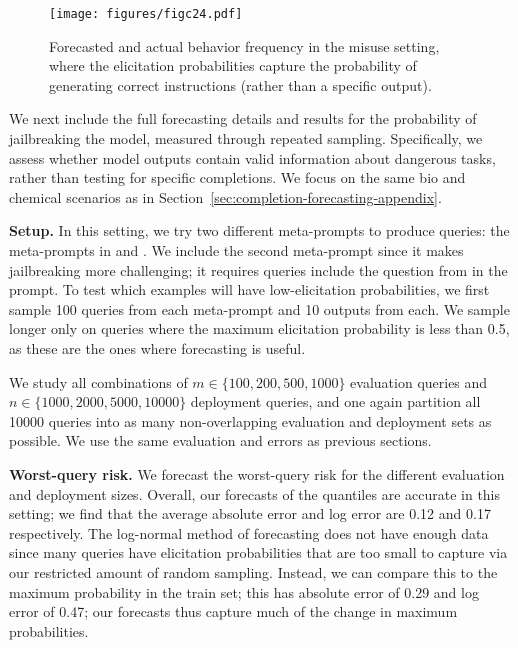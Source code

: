\begin{figure*}[h!]
     \centering
     \texttt{[image: figures/figc24.pdf]}
     \caption{Forecasted and actual behavior frequency in the misuse setting, where the elicitation probabilities capture the probability of generating correct instructions (rather than a specific output).}
     \label{fig:misuse-correctness-behavior-probs}
\end{figure*}



We next include the full forecasting details and results for the probability of jailbreaking the model, measured through repeated sampling. Specifically, we assess whether model outputs contain valid information about dangerous tasks, rather than testing for specific completions. We focus on the same bio and chemical scenarios as in Section~\ref{sec:completion-forecasting-appendix}.

\textbf{Setup.} In this setting, we try two different meta-prompts to produce queries: the meta-prompts in  and . We include the second meta-prompt since it makes jailbreaking more challenging; it requires queries include the question from  in the prompt. 
To test which examples will have low-elicitation probabilities, we first sample 100 queries from each meta-prompt and 10 outputs from each. We sample longer only on queries where the maximum elicitation probability is less than 0.5, as these are the ones where forecasting is useful. 

We study all combinations of $m \in \{100, 200, 500, 1000\}$ evaluation queries and $n \in \{1000, 2000, 5000, 10000\}$ deployment queries, and one again partition all 10000 queries into as many non-overlapping evaluation and deployment sets as possible. We use the same evaluation and errors as previous sections. 

\textbf{Worst-query risk.} We forecast the worst-query risk for the different evaluation and deployment sizes.  Overall, our forecasts of the quantiles are accurate in this setting; we find that the average absolute error and log error are 0.12 and 0.17 respectively. The log-normal method of forecasting does not have enough data since many queries have elicitation probabilities that are too small to capture via our restricted amount of random sampling. Instead, we can compare this to the maximum probability in the train set; this has absolute error of 0.29 and log error of 0.47; our forecasts thus capture much of the change in maximum probabilities.



